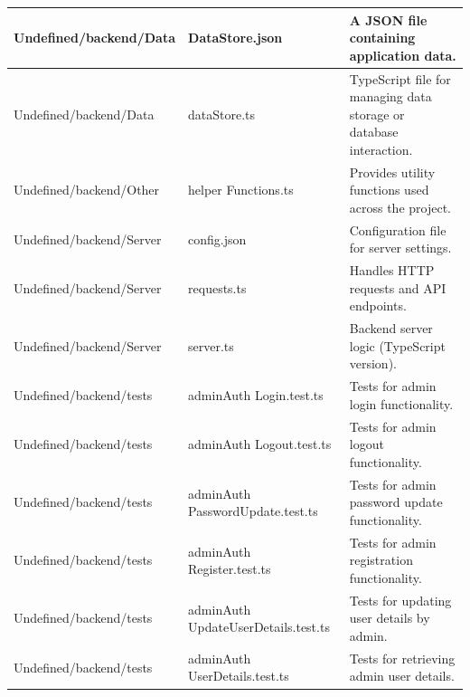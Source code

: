 \documentclass[conference]{IEEEtran}
\begin{document}
\begin{table}[H]
\begin{adjustbox}{max width=\textwidth}
\begin{tabular}{|>{\centering\arraybackslash}p{2.8cm}|>{\centering\arraybackslash}p{1.5cm}|p{3.5cm}|}
            Undefined/backend/Data& DataStore.json  & A JSON file containing application data.   \\
            \hline
             Undefined/backend/Data  & dataStore.ts  & TypeScript file for managing data storage or database interaction.   \\
            \hline
            Undefined/backend/Other  & helper
            Functions.ts  & Provides utility functions used across the project.   \\
            \hline
            Undefined/backend/Server  & config.json  & Configuration file for server settings.   \\
            \hline
            Undefined/backend/Server  & requests.ts  & Handles HTTP requests and API endpoints.   \\
            \hline
            Undefined/backend/Server  & server.ts  & Backend server logic (TypeScript version).   \\
            \hline
            Undefined/backend/tests  & adminAuth
            Login.test.ts  & Tests for admin login functionality.   \\
            \hline
            Undefined/backend/tests  & adminAuth
            Logout.test.ts  & Tests for admin logout functionality.   \\
            \hline
            Undefined/backend/tests  & adminAuth
            PasswordUpdate.test.ts  & Tests for admin password update functionality.   \\
            \hline
            Undefined/backend/tests  & adminAuth
            Register.test.ts  & Tests for admin registration functionality.   \\
            \hline
            Undefined/backend/tests  & adminAuth
            UpdateUserDetails.test.ts  & Tests for updating user details by admin.   \\
            \hline
            Undefined/backend/tests  & adminAuth
            UserDetails.test.ts  & Tests for retrieving admin user details.   \\
            \hline
        \end{tabular}
    \end{adjustbox}
\end{table}
\end{document}
